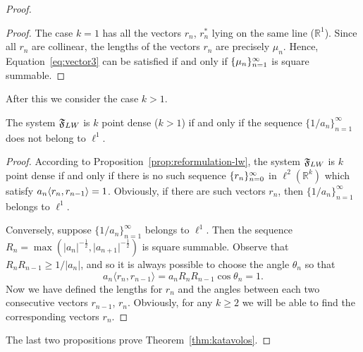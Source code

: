 \begin{proof}
\begin{proof}
      The case $k=1$ has all the vectors $r_n$, $r^*_n$ lying on the same line ($\mathbb{R}^1$).
      Since all $r_n$ are collinear, the lengths of the vectors $r_n$ are precisely $\mu_n$.
      Hence, Equation~\eqref{eq:vector3} can be satisfied if and only if $\{{\mu}_n\}_{n=1}^\infty$ is square summable.
    \end{proof}

    After this we consider the case $k > 1$.
    \begin{prop}
      The system $\mathfrak{F}_{LW}$ is $k$ point dense \textup($k > 1$\textup) if and only if the sequence $\{1/a_n\}_{n=1}^\infty$
        does not belong to $\ell^1$.
    \end{prop}
    \begin{proof}
      According to Proposition~\ref{prop:reformulation-lw}, the system $\mathfrak{F}_{LW}$ is $k$ point dense
        if and only if there is no such sequence $\{{r}_n\}_{n=0}^\infty$ in $\ell^2(\mathbb{R}^k)$ which satisfy $a_n \langle r_n, r_{n-1} \rangle = 1$.
      Obviously, if there are such vectors $r_n$, then $\{1/a_n\}_{n=1}^\infty$ belongs to $\ell^1$.

      Conversely, suppose $\{1/a_n\}_{n=1}^\infty$ belongs to $\ell^1$.
      Then the sequence $R_n = \max(\lvert a_n \rvert^{-\frac{1}{2}}, \lvert a_{n+1} \rvert^{-\frac{1}{2}})$ is square summable.
      Observe that $R_nR_{n-1} \geq 1/\lvert a_n\rvert$, and so it is always possible to choose the angle $\theta_n$ so that
      \[
        a_n \langle r_n, r_{n-1} \rangle = a_n R_n R_{n-1}\cos{\theta_n} = 1.
      \]
      Now we have defined the lengths for $r_n$ and the angles between each two consecutive vectors $r_{n-1}$, $r_n$.
      Obviously, for any $k \geq 2$ we will be able to find the corresponding vectors $r_n$.
    \end{proof}
    The last two propositions prove Theorem~\ref{thm:katavolos}.
  \end{proof}
